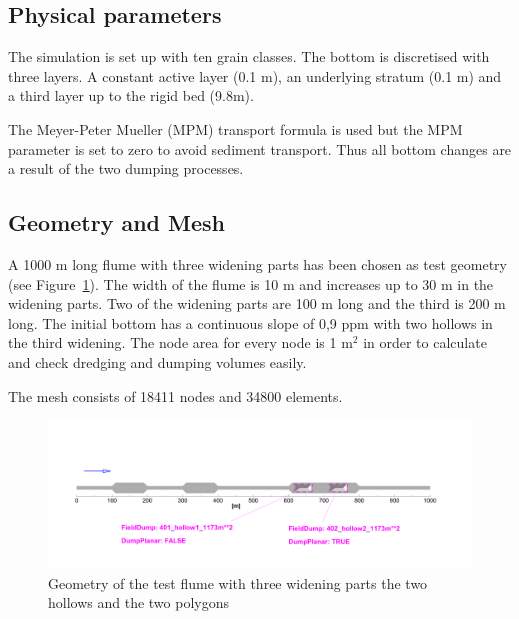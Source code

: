%
%
\subsection{Physical parameters}
%
The simulation is set up with ten grain classes.
The bottom is discretised with three layers. A constant active layer (0.1 m), an underlying stratum (0.1 m) and a third layer up to the rigid bed (9.8m).

The Meyer-Peter Mueller (MPM) transport formula is used but the MPM parameter is set to zero to avoid sediment transport. Thus all bottom changes are a result of the two dumping processes.
%
%
\subsection{Geometry and Mesh}
%
A 1000 m long flume with three widening parts has been chosen as test geometry (see Figure~\ref{ini}).
The width of the flume is 10 m and increases up to 30 m in the widening parts.
Two of the widening parts are 100 m long and the third is 200 m long.
The initial bottom has a continuous slope of 0,9 ppm with two hollows in the third widening.
The node area for every node is 1 m$^2$ in order to calculate and check dredging and dumping volumes easily.

The mesh consists of 18411 nodes and 34800 elements.

\begin{figure} [!h]
\centering
\includegraphics[scale=0.14]{result000.png}
 \caption{Geometry of the test flume with three widening parts the two hollows and the two polygons}\label{ini}
\end{figure}


%
%
